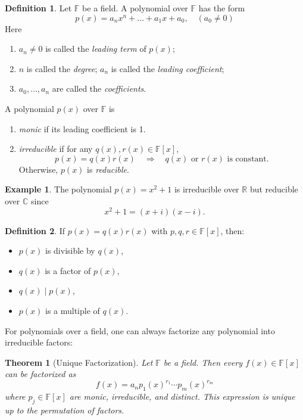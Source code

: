 \documentclass[11pt,openany]{book}
\theoremstyle{plain}
\newtheorem{theorem}{Theorem}[chapter]
\theoremstyle{definition}
\newtheorem{definition}[definition]{Definition}
\newtheorem{example}[example]{Example}
\theoremstyle{remark}
\begin{document}
\begin{definition}  
Let $\mathbb{F}$ be a field. A polynomial over $\mathbb{F}$ has the form
    \[
        p(x) = a_n x^n + \dots + a_1 x + a_0, \quad (a_0 \neq 0)
    \]
    Here
    \begin{enumerate}
    \item $a_n \neq 0$ is called the \textit{leading term} of $p(x)$; 
    \item $n$ is called the \textit{degree}; $a_n$ is called the \textit{leading coefficient}; 
    \item $a_0, \dots, a_n$ are called the \textit{coefficients}.
\end{enumerate}
    A polynomial $p(x)$ over $\mathbb{F}$ is 
\begin{enumerate}
    \item \textit{monic} if its leading coefficient is 1.

    \item \textit{irreducible} if for any $q(x), r(x) \in \mathbb{F}[x]$,
    \[
        p(x) = q(x)r(x) \quad \Rightarrow \quad q(x) \text{ or } r(x) \text{ is constant}.
    \]
    Otherwise, $p(x)$ is \textit{reducible}.
\end{enumerate}
\end{definition}

\begin{example}  
The polynomial $p(x) = x^2 + 1$ is irreducible over $\mathbb{R}$ but reducible over $\mathbb{C}$ since
\[
    x^2 + 1 = (x+i)(x-i).
\]
\end{example}

\begin{definition}  
If $p(x) = q(x)r(x)$ with $p,q,r \in \mathbb{F}[x]$, then:
\begin{itemize}
    \item $p(x)$ is divisible by $q(x)$,
    \item $q(x)$ is a factor of $p(x)$,
    \item $q(x) \mid p(x)$,
    \item $p(x)$ is a multiple of $q(x)$.
\end{itemize}
\end{definition}

For polynomials over a field, one can always factorize any polynomial into irreducible factors:
\begin{theorem} [Unique Factorization] 
Let $\mathbb{F}$ be a field. Then every $f(x) \in \mathbb{F}[x]$ can be factorized as
\[
    f(x) = a_n p_1(x)^{r_1} \cdots p_m(x)^{r_m}
\]
where $p_j \in \mathbb{F}[x]$ are monic, irreducible, and distinct. This expression is unique up to the permutation of factors.
\end{theorem}
\end{document}
